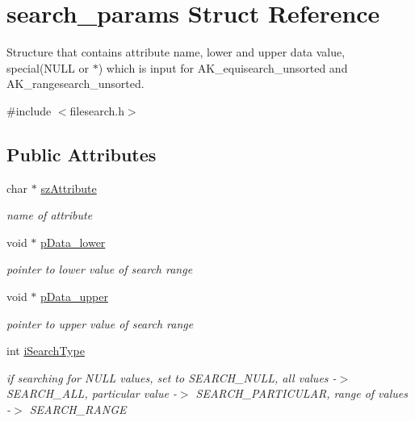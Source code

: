 \hypertarget{structsearch__params}{}\section{search\+\_\+params Struct Reference}
\label{structsearch__params}


Structure that contains attribute name, lower and upper data value, special(\+N\+U\+L\+L or $\ast$) which is input for A\+K\+\_\+equisearch\+\_\+unsorted and A\+K\+\_\+rangesearch\+\_\+unsorted.  




{\ttfamily \#include $<$filesearch.\+h$>$}

\subsection*{Public Attributes}
\begin{DoxyCompactItemize}
\item 
\mbox{\label{structsearch__params_ae8faeffae5fba755ed9f93a0028200ce}} 
char $\ast$ \hyperlink{structsearch__params_ae8faeffae5fba755ed9f93a0028200ce}{sz\+Attribute}
\begin{DoxyCompactList}\small\item\em name of attribute \end{DoxyCompactList}\item 
\mbox{\label{structsearch__params_a061c7b5e9a3163f19dac0d3a681d63d0}} 
void $\ast$ \hyperlink{structsearch__params_a061c7b5e9a3163f19dac0d3a681d63d0}{p\+Data\+\_\+lower}
\begin{DoxyCompactList}\small\item\em pointer to lower value of search range \end{DoxyCompactList}\item 
\mbox{\label{structsearch__params_ab5b610fb21d476cb745ea943f8cf01f8}} 
void $\ast$ \hyperlink{structsearch__params_ab5b610fb21d476cb745ea943f8cf01f8}{p\+Data\+\_\+upper}
\begin{DoxyCompactList}\small\item\em pointer to upper value of search range \end{DoxyCompactList}\item 
\mbox{\label{structsearch__params_afbc6035423d003364a44bc5c984b49fa}} 
int \hyperlink{structsearch__params_afbc6035423d003364a44bc5c984b49fa}{i\+Search\+Type}
\begin{DoxyCompactList}\small\item\em if searching for N\+U\+LL values, set to S\+E\+A\+R\+C\+H\+\_\+\+N\+U\+LL, all values -\/$>$ S\+E\+A\+R\+C\+H\+\_\+\+A\+LL, particular value -\/$>$ S\+E\+A\+R\+C\+H\+\_\+\+P\+A\+R\+T\+I\+C\+U\+L\+AR, range of values -\/$>$ S\+E\+A\+R\+C\+H\+\_\+\+R\+A\+N\+GE \end{DoxyCompactList}\end{DoxyCompactItemize}


